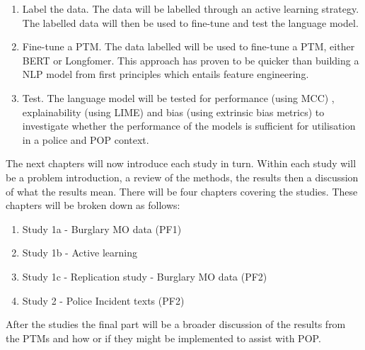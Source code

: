 \begin{enumerate}
    \item Label the data. The data will be labelled through an active learning strategy. The labelled data will then be used to fine-tune and test the language model.
    
    \item Fine-tune a PTM. The data labelled will be used to fine-tune a PTM, either BERT or Longfomer. This approach has proven to be quicker than building a NLP model from first principles which entails feature engineering.
    
    \item Test. The language model will be tested for performance (using MCC) , explainability (using LIME)  and bias (using extrinsic bias metrics) to investigate whether the performance of the models is sufficient for utilisation in a police and POP context. 
\end{enumerate}


The next chapters will now introduce each study in turn. Within each study will be a problem introduction, a review of the methods, the results then a discussion of what the results mean. There will be four chapters covering the studies. These chapters will be broken down as follows:

\begin{enumerate}
\item Study 1a - Burglary MO data (PF1) 
\item Study 1b - Active learning
\item Study 1c - Replication study - Burglary MO data (PF2)
\item Study 2 - Police Incident texts (PF2)
\end{enumerate}

After the studies the final part will be a broader discussion of the results from the PTMs and how or if they might be implemented to assist with POP.

